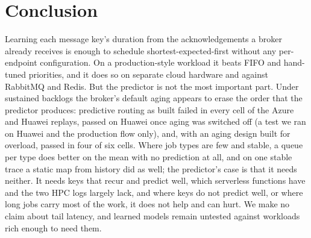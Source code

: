 \section{Conclusion}
Learning each message key's duration from the acknowledgements a broker already receives is enough to schedule
shortest-expected-first without any per-endpoint configuration. On a production-style workload it beats FIFO and hand-tuned
priorities, and it does so on separate cloud hardware and against RabbitMQ and Redis. But the predictor is not the most important part.
Under sustained backlogs the broker's default aging appears to erase the order that the predictor produces: predictive routing as built failed in every cell of the Azure and Huawei replays,
passed on Huawei once aging was switched off (a test we ran on Huawei and the production flow only), and, with an aging design built for overload, passed in four of six cells. Where job types are few and stable, a queue per type does better on the mean with no
prediction at all, and on one stable trace a static map from history did as well; the predictor's case is that it needs neither. It needs keys that recur and predict well, which serverless functions have and the two HPC logs largely lack, and where keys do not
predict well, or where long jobs carry most of the work, it does not help and can hurt. We make no claim about tail latency, and learned models remain untested against workloads rich enough to need them.
